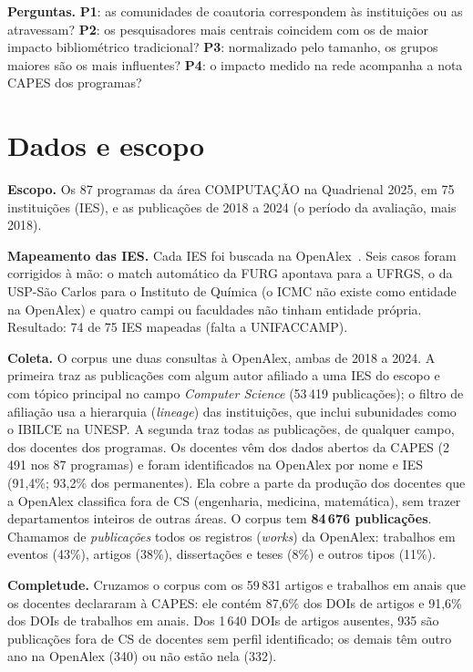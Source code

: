 \documentclass[12pt]{projeto}
\begin{document}
\textbf{Perguntas.} \textbf{P1}: as comunidades de coautoria correspondem às instituições ou as atravessam? \textbf{P2}: os pesquisadores mais centrais coincidem com os de maior impacto bibliométrico tradicional? \textbf{P3}: normalizado pelo tamanho, os grupos maiores são os mais influentes? \textbf{P4}: o impacto medido na rede acompanha a nota CAPES dos programas?

\section{Dados e escopo}

\textbf{Escopo.} Os 87 programas da área COMPUTAÇÃO na Quadrienal 2025, em 75 instituições (IES), e as publicações de 2018 a 2024 (o período da avaliação, mais 2018).

\textbf{Mapeamento das IES.} Cada IES foi buscada na OpenAlex~\cite{openalex}. Seis casos foram corrigidos à mão: o match automático da FURG apontava para a UFRGS, o da USP-São Carlos para o Instituto de Química (o ICMC não existe como entidade na OpenAlex) e quatro campi ou faculdades não tinham entidade própria. Resultado: 74 de 75 IES mapeadas (falta a UNIFACCAMP).

\textbf{Coleta.} O corpus une duas consultas à OpenAlex, ambas de 2018 a 2024. A primeira traz as publicações com algum autor afiliado a uma IES do escopo e com tópico principal no campo \emph{Computer Science} (53\,419 publicações); o filtro de afiliação usa a hierarquia (\emph{lineage}) das instituições, que inclui subunidades como o IBILCE na UNESP. A segunda traz todas as publicações, de qualquer campo, dos docentes dos programas. Os docentes vêm dos dados abertos da CAPES (2\,491 nos 87 programas) e foram identificados na OpenAlex por nome e IES (91,4\%; 93,2\% dos permanentes). Ela cobre a parte da produção dos docentes que a OpenAlex classifica fora de CS (engenharia, medicina, matemática), sem trazer departamentos inteiros de outras áreas. O corpus tem \textbf{84\,676 publicações}. Chamamos de \emph{publicações} todos os registros (\emph{works}) da OpenAlex: trabalhos em eventos (43\%), artigos (38\%), dissertações e teses (8\%) e outros tipos (11\%).

\textbf{Completude.} Cruzamos o corpus com os 59\,831 artigos e trabalhos em anais que os docentes declararam à CAPES: ele contém 87,6\% dos DOIs de artigos e 91,6\% dos DOIs de trabalhos em anais. Dos 1\,640 DOIs de artigos ausentes, 935 são publicações fora de CS de docentes sem perfil identificado; os demais têm outro ano na OpenAlex (340) ou não estão nela (332).
\end{document}
